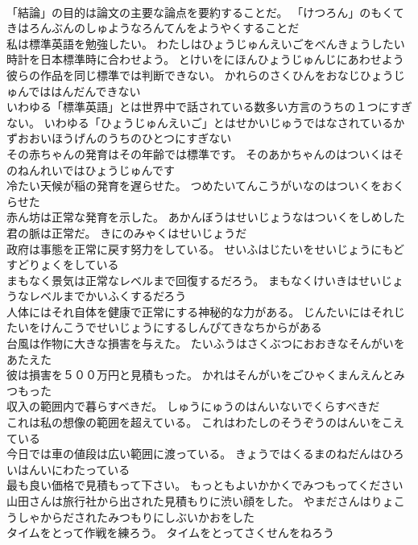 \documentclass[8pt]{extreport}
\begin{document}
\begin{CJK}{UTF8}{min}
\\	「結論」の目的は論文の主要な論点を要約することだ。	「けつろん」のもくてきはろんぶんのしゅようなろんてんをようやくすることだ 
\\	私は標準英語を勉強したい。	わたしはひょうじゅんえいごをべんきょうしたい 
\\	時計を日本標準時に合わせよう。	とけいをにほんひょうじゅんじにあわせよう 
\\	彼らの作品を同じ標準では判断できない。	かれらのさくひんをおなじひょうじゅんでははんだんできない 
\\	いわゆる「標準英語」とは世界中で話されている数多い方言のうちの１つにすぎない。	いわゆる「ひょうじゅんえいご」とはせかいじゅうではなされているかずおおいほうげんのうちのひとつにすぎない 
\\	その赤ちゃんの発育はその年齢では標準です。	そのあかちゃんのはついくはそのねんれいではひょうじゅんです 
\\	冷たい天候が稲の発育を遅らせた。	つめたいてんこうがいなのはついくをおくらせた 
\\	赤ん坊は正常な発育を示した。	あかんぼうはせいじょうなはついくをしめした 
\\	君の脈は正常だ。	きにのみゃくはせいじょうだ 
\\	政府は事態を正常に戻す努力をしている。	せいふはじたいをせいじょうにもどすどりょくをしている 
\\	まもなく景気は正常なレベルまで回復するだろう。	まもなくけいきはせいじょうなレベルまでかいふくするだろう 
\\	人体にはそれ自体を健康で正常にする神秘的な力がある。	じんたいにはそれじたいをけんこうでせいじょうにするしんぴてきなちからがある 
\\	台風は作物に大きな損害を与えた。	たいふうはさくぶつにおおきなそんがいをあたえた 
\\	彼は損害を５００万円と見積もった。	かれはそんがいをごひゃくまんえんとみつもった 
\\	収入の範囲内で暮らすべきだ。	しゅうにゅうのはんいないでくらすべきだ 
\\	これは私の想像の範囲を超えている。	これはわたしのそうぞうのはんいをこえている 
\\	今日では車の値段は広い範囲に渡っている。	きょうではくるまのねだんはひろいはんいにわたっている 
\\	最も良い価格で見積もって下さい。	もっともよいかかくでみつもってください 
\\	山田さんは旅行社から出された見積もりに渋い顔をした。	やまださんはりょこうしゃからだされたみつもりにしぶいかおをした 
\\	タイムをとって作戦を練ろう。	タイムをとってさくせんをねろう 

\end{CJK}
\end{document}
